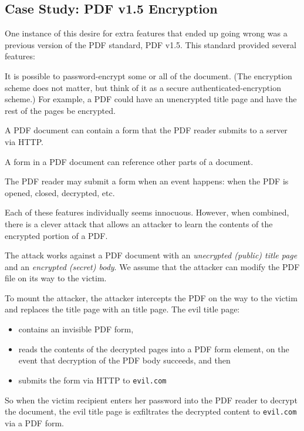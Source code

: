 \subsection{Case Study: PDF v1.5 Encryption}
One instance of this desire for extra features
that ended up going wrong was a previous version
of the PDF standard, PDF v1.5.\autocite{muller2019practical}
This standard provided several features:
\begin{compactenum}
	\item It is possible to password-encrypt some or all of the document.
        (The encryption scheme does not matter, but think of it as
        a secure authenticated-encryption scheme.)
        For example, a PDF could have an unencrypted title page 
        and have the rest of the pages be encrypted.
	\item A PDF document can contain a form that the PDF reader
        submits to a server via HTTP.
	\item A form in a PDF document can reference other parts of a document.
	\item The PDF reader may submit a form when an event happens:
        when the PDF is opened, closed, decrypted, etc.
\end{compactenum}

Each of these features individually seems innocuous.
However, when combined, there is a clever attack that allows an attacker to 
learn the contents of the encrypted portion of a PDF.

The attack works against a PDF document with an \emph{unecrypted (public)
title page}
and an \emph{encrypted (secret) body}.
We assume that the attacker can modify the PDF 
file on its way to the victim.

To mount the attacker, the attacker intercepts the
PDF on the way to the victim and replaces the
title page with an  title page.
The evil title page:
\begin{itemize}[noitemsep]
    \item contains an invisible PDF form,
    \item reads the contents of the decrypted pages into a PDF form element,
          on the event that decryption of the PDF body succeeds, 
          and then
    \item submits the form via HTTP to \texttt{evil.com}
\end{itemize}
So when the victim recipient enters her password into the PDF
reader to decrypt the document, the evil title page is exfiltrates
the decrypted content to \texttt{evil.com} via a PDF form.


